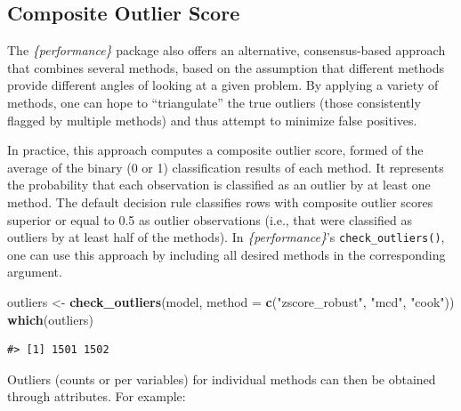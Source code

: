 \documentclass[sn-basic, lineno,pdflatex]{sn-jnl}
\newenvironment{Shaded}{\begin{snugshade}}{\end{snugshade}}
\newcommand{\AttributeTok}[1]{\textcolor[rgb]{0.13,0.29,0.53}{#1}}
\newcommand{\FunctionTok}[1]{\textcolor[rgb]{0.13,0.29,0.53}{\textbf{#1}}}
\newcommand{\NormalTok}[1]{#1}
\newcommand{\OtherTok}[1]{\textcolor[rgb]{0.56,0.35,0.01}{#1}}
\newcommand{\SpecialCharTok}[1]{\textcolor[rgb]{0.81,0.36,0.00}{\textbf{#1}}}
\newcommand{\StringTok}[1]{\textcolor[rgb]{0.31,0.60,0.02}{#1}}
\begin{document}
\subsection{Composite Outlier Score}\label{composite-outlier-score}

The \emph{\{performance\}} package also offers an alternative,
consensus-based approach that combines several methods, based on the
assumption that different methods provide different angles of looking at
a given problem. By applying a variety of methods, one can hope to
``triangulate'' the true outliers (those consistently flagged by
multiple methods) and thus attempt to minimize false positives.

In practice, this approach computes a composite outlier score, formed of
the average of the binary (0 or 1) classification results of each
method. It represents the probability that each observation is
classified as an outlier by at least one method. The default decision
rule classifies rows with composite outlier scores superior or equal to
0.5 as outlier observations (i.e., that were classified as outliers by
at least half of the methods). In \emph{\{performance\}}'s
\texttt{check\_outliers()}, one can use this approach by including all
desired methods in the corresponding argument.

\begin{Shaded}
\begin{Highlighting}[]
\NormalTok{outliers }\OtherTok{\textless{}{-}} \FunctionTok{check\_outliers}\NormalTok{(model, }\AttributeTok{method =} \FunctionTok{c}\NormalTok{(}\StringTok{"zscore\_robust"}\NormalTok{, }\StringTok{"mcd"}\NormalTok{, }\StringTok{"cook"}\NormalTok{))}
\FunctionTok{which}\NormalTok{(outliers)}
\end{Highlighting}
\end{Shaded}

\begin{verbatim}
#> [1] 1501 1502
\end{verbatim}

Outliers (counts or per variables) for individual methods can then be
obtained through attributes. For example:

\begin{Shaded}
\end{Shaded}
\end{document}
